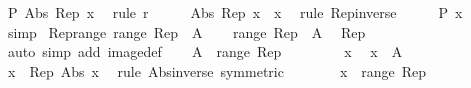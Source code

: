 \begin{isabellebody}
\ {\isachardoublequoteopen}P\ {\isacharparenleft}{\kern0pt}Abs\ {\isacharparenleft}{\kern0pt}Rep\ x{\isacharparenright}{\kern0pt}{\isacharparenright}{\kern0pt}{\isachardoublequoteclose}\ \isamarkupfalse%
\ {\isacharparenleft}{\kern0pt}rule\ r{\isacharparenright}{\kern0pt}\isanewline
\ \ \isamarkupfalse%
\ \isamarkupfalse%
\ {\isachardoublequoteopen}Abs\ {\isacharparenleft}{\kern0pt}Rep\ x{\isacharparenright}{\kern0pt}\ {\isacharequal}{\kern0pt}\ x{\isachardoublequoteclose}\ \isamarkupfalse%
\ {\isacharparenleft}{\kern0pt}rule\ Rep{\isacharunderscore}{\kern0pt}inverse{\isacharparenright}{\kern0pt}\isanewline
\ \ \isamarkupfalse%
\ \isamarkupfalse%
\ {\isachardoublequoteopen}P\ x{\isachardoublequoteclose}\ \isamarkupfalse%
\ simp\isanewline
{}\isamarkupfalse%
%
\endisatagproof
{\isafoldproof}%
%
\isadelimproof
\isanewline
%
\endisadelimproof
\isanewline
{}\isamarkupfalse%
\ Rep{\isacharunderscore}{\kern0pt}range{\isacharcolon}{\kern0pt}\ {\isachardoublequoteopen}range\ Rep\ {\isacharequal}{\kern0pt}\ A{\isachardoublequoteclose}\isanewline
%
\isadelimproof
%
\endisadelimproof
%
\isatagproof
{}\isamarkupfalse%
\isanewline
\ \ \isamarkupfalse%
\ {\isachardoublequoteopen}range\ Rep\ {\isasymsubseteq}\ A{\isachardoublequoteclose}\ \isamarkupfalse%
\ Rep\ \isamarkupfalse%
\ {\isacharparenleft}{\kern0pt}auto\ simp\ add{\isacharcolon}{\kern0pt}\ image{\isacharunderscore}{\kern0pt}def{\isacharparenright}{\kern0pt}\isanewline
\ \ \isamarkupfalse%
\ {\isachardoublequoteopen}A\ {\isasymsubseteq}\ range\ Rep{\isachardoublequoteclose}\isanewline
\ \ \isamarkupfalse%
\isanewline
\ \ \ \ \isamarkupfalse%
\ x\ \isamarkupfalse%
\ {\isachardoublequoteopen}x\ {\isasymin}\ A{\isachardoublequoteclose}\isanewline
\ \ \ \ \isamarkupfalse%
\ \isamarkupfalse%
\ {\isachardoublequoteopen}x\ {\isacharequal}{\kern0pt}\ Rep\ {\isacharparenleft}{\kern0pt}Abs\ x{\isacharparenright}{\kern0pt}{\isachardoublequoteclose}\ \isamarkupfalse%
\ {\isacharparenleft}{\kern0pt}rule\ Abs{\isacharunderscore}{\kern0pt}inverse\ {\isacharbrackleft}{\kern0pt}symmetric{\isacharbrackright}{\kern0pt}{\isacharparenright}{\kern0pt}\isanewline
\ \ \ \ \isamarkupfalse%
\ \isamarkupfalse%
\ {\isachardoublequoteopen}x\ {\isasymin}\ range\ Rep{\isachardoublequoteclose}\ \isamarkupfalse%

\end{isabellebody}
